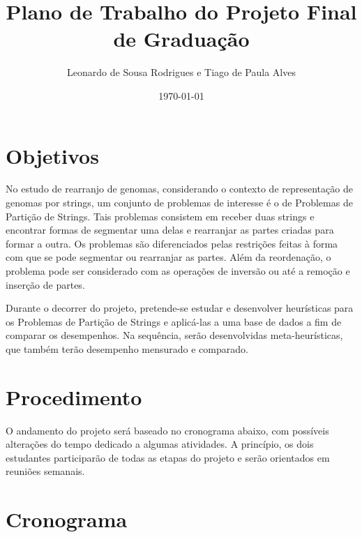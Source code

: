 \documentclass[a4paper, 11pt]{article}
\title{Plano de Trabalho do Projeto Final de Graduação}
\author{Leonardo de Sousa Rodrigues e Tiago de Paula Alves}
\date{\today}
\begin{document}
    \maketitle

    \section{Objetivos}
    
        No estudo de rearranjo de genomas, considerando o contexto de representação de genomas por strings, um conjunto de problemas de interesse é o de Problemas de Partição de Strings. Tais problemas consistem em receber duas strings e encontrar formas de segmentar uma delas e rearranjar as partes criadas para formar a outra. Os problemas são diferenciados pelas restrições feitas à forma com que se pode segmentar ou rearranjar as partes. Além da reordenação, o problema pode ser considerado com as operações de inversão ou até a remoção e inserção de partes.

        Durante o decorrer do projeto, pretende-se estudar e desenvolver heurísticas para os Problemas de Partição de Strings e aplicá-las a uma base de dados a fim de comparar os desempenhos. Na sequência, serão desenvolvidas meta-heurísticas, que também terão desempenho mensurado e comparado.

    \section{Procedimento}

        O andamento do projeto será baseado no cronograma abaixo, com possíveis alterações do tempo dedicado a algumas atividades. A princípio, os dois estudantes participarão de todas as etapas do projeto e serão orientados em reuniões semanais.

    \section{Cronograma}
\end{document}
